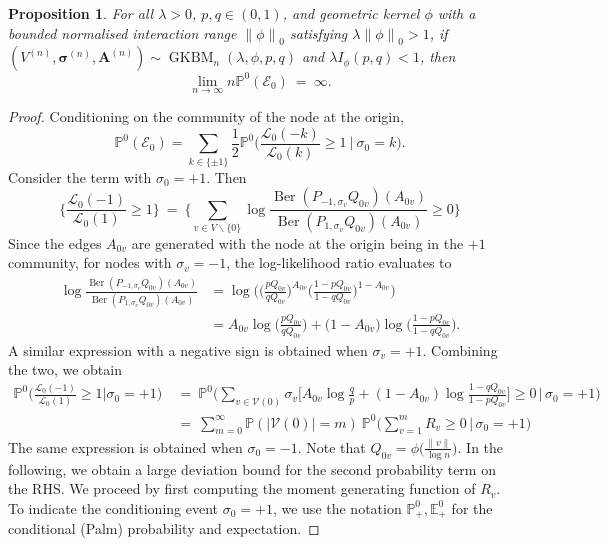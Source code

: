 \documentclass[10pt,a4paper]{amsart}
\newtheorem{prop}{Proposition}
\newcommand{\Ber}{\operatorname{Ber}}
\def\E{\mathbb{E}}
\newcommand{\GKBM}{\operatorname{GKBM}}
\def\P{\mathbb{P}}
\def\bA{\bm{A}}
\newcommand{\bsigma}{\bm{\sigma}}
\def\cE{\mathcal{E}}
\def\cL{\mathcal{L}}
\def\cV{\mathcal{V}}
\newcommand{\la}{\lambda}
\def\weq{ \ = \ }
\newcommand{\zeronorm}[1]{{\lVert#1\rVert}_0}
\begin{document}
\begin{prop}
\label{prop:origin_bad}
For all $\la >0$, $p,q \in(0,1)$, and geometric kernel $\phi$
with a bounded normalised interaction range $\zeronorm{\phi}$ satisfying $\la \zeronorm{\phi} >1$,  if $(V^{(n)}, \bsigma^{(n)}, \bA^{(n)}) \sim \GKBM_n(\la, \phi, p, q)$ and $\la I_{\phi}(p,q) <1$, then
\[
\lim_{n \to \infty}  n \P^0(\cE_0)
\weq \infty.
\]
\end{prop}

\begin{proof}
Conditioning on the community of the node at the origin,
\begin{equation}
\P^0(\cE_0)
= \sum_{k \in \{\pm 1\}} \frac12 \P^0\bigg(\frac{\cL_0(-k)}{\cL_0(k)} \ge 1\ \Big|\  \sigma_0 = k\bigg).
\label{eq:origin_bad}
\end{equation}
Consider the term with $\sigma_0 = +1$. Then
\[
\bigg\{\frac{\cL_0(-1)}{\cL_0(1)} \ge 1 \bigg\} \weq \bigg\{\sum_{v\in V\backslash \{0 \}} \log \frac{\Ber(P_{-1, \sigma_v}Q_{0v})(A_{0v})}{\Ber(P_{1,\sigma_v}Q_{0v})(A_{0v})} \ge 0\bigg\}
\]
Since the edges $A_{0v}$ are generated with the node at the origin being in the $+1$ community, for nodes with $\sigma_v=-1$, the log-likelihood ratio evaluates to
\begin{align*}
\log \frac{\Ber(P_{-1, \sigma_v}Q_{0v})(A_{0v})}{\Ber(P_{1,\sigma_v}Q_{0v})(A_{0v})} 
&= 
\log \bigg(\Big(\frac{pQ_{0v}}{qQ_{0v}}\Big)^{A_{0v}}\Big(\frac{1-pQ_{0v}}{1-qQ_{0v}}\Big)^{1-A_{0v}}\bigg)\\
&=
A_{0v}\log \Big(\frac{pQ_{0v}}{qQ_{0v}}\Big)+ \big( 1-A_{0v} \big)\log\bigg(\frac{1-pQ_{0v}}{1-qQ_{0v}}\bigg).
\end{align*}
A similar expression with a negative sign is obtained when $\sigma_v=+1$. Combining the two, we obtain
\begin{align}
\P^0\Big( \frac{\cL_0(-1)}{\cL_0(1)} \ge 1\Big|\sigma_0=+1\Big)& \weq \P^0\Big( \sum_{v\in \cV(0)}\sigma_v\Big[A_{0v}\log\frac{q}{p}+(1-A_{0v}) \log \frac{1-qQ_{0v}}{1-pQ_{0v}}\Big]\ge 0 \,\Big|\,\sigma_0=+1\Big) \nonumber\\
&\weq \sum_{m=0}^\infty \P(|\cV(0)|=m) \ \P^0\Big( \sum_{v=1}^m R_v \ge 0 \,\Big|\,\sigma_0=+1\Big)%
\label{eq:map_Poisson_sum}
\end{align}
The same expression is obtained when $\sigma_0=-1$. Note that $Q_{0v} = \phi\Big(\frac{\|v\|}{\log n}\Big)$. In the following, we obtain a large deviation bound for the second probability term on the RHS. %
We proceed by first computing the moment generating function of $R_v$. To indicate the conditioning event $\sigma_0=+1$, we use the notation $\P^0_+, \E^0_+$ for the conditional (Palm) probability and expectation.


\end{proof}
\end{document}
